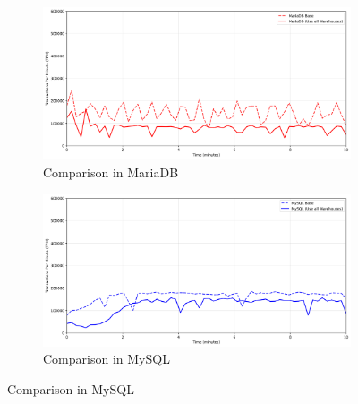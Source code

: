 \begin{figure}[H]
    \centering
    \hspace*{-1.7cm}
    \begin{subfigure}[b]{0.6\textwidth}
        \centering
        \includegraphics[width=\linewidth]{Images/database_count_comparison_MariaDB.png}
        \caption{Comparison in MariaDB}
        \label{fig:all-wh-maria}
    \end{subfigure}%
    \begin{subfigure}[b]{0.6\textwidth}
        \centering
        \includegraphics[width=\linewidth]{Images/database_count_comparison_MySQL.png}
        \caption{Comparison in MySQL}
        \label{fig:all-wh-mysql}
    \end{subfigure}

    \vspace{0.5cm}


\end{figure}
